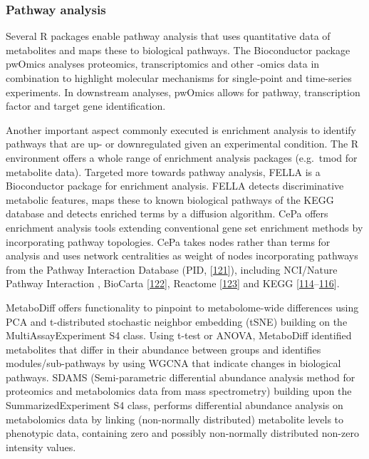 \documentclass[]{article}
\begin{document}
\hypertarget{pathway-analysis}{%
\subsubsection{Pathway analysis}\label{pathway-analysis}}

Several R packages enable pathway analysis that uses quantitative data of metabolites and maps these to biological pathways. The Bioconductor package pwOmics analyses proteomics, transcriptomics and other -omics data in combination to highlight molecular mechanisms for single-point and time-series experiments. In downstream analyses, pwOmics allows for pathway, transcription factor and target gene identification.

Another important aspect commonly executed is enrichment analysis to identify pathways that are up- or downregulated given an experimental condition. The R environment offers a whole range of enrichment analysis packages (e.g.~tmod for metabolite data). Targeted more towards pathway analysis, FELLA is a Bioconductor package for enrichment analysis. FELLA detects discriminative metabolic features, maps these to known biological pathways of the KEGG database and detects enriched terms by a diffusion algorithm. CePa offers enrichment analysis tools extending conventional gene set enrichment methods by incorporating pathway topologies. CePa takes nodes rather than terms for analysis and uses network centralities as weight of nodes incorporating pathways from the Pathway Interaction Database (PID, {[}\protect\hyperlink{ref-schaefer_2009}{121}{]}), including NCI/Nature Pathway Interaction , BioCarta {[}\protect\hyperlink{ref-nishimura_2001}{122}{]}, Reactome {[}\protect\hyperlink{ref-fabregat_2018}{123}{]} and KEGG {[}\protect\hyperlink{ref-kanehisa_2017}{114}--\protect\hyperlink{ref-kanehisa_2000}{116}{]}.

MetaboDiff offers functionality to pinpoint to metabolome-wide differences using PCA and t-distributed stochastic neighbor embedding (tSNE) building on the MultiAssayExperiment S4 class. Using t-test or ANOVA, MetaboDiff identified metabolites that differ in their abundance between groups and identifies modules/sub-pathways by using WGCNA that indicate changes in biological pathways. SDAMS (Semi-parametric differential abundance analysis method for proteomics and metabolomics data from mass spectrometry) building upon the SummarizedExperiment S4 class, performs differential abundance analysis on metabolomics data by linking (non-normally distributed) metabolite levels to phenotypic data, containing zero and possibly non-normally distributed non-zero intensity values.
\end{document}

